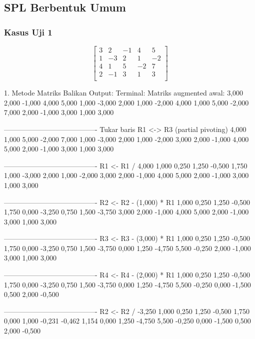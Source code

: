 \documentclass[12pt]{article}
\begin{document}
\begin{enumerate}
\subsection{SPL Berbentuk Umum}
\subsubsection{Kasus Uji 1}
\begin{equation}
    \begin{bmatrix}
        3 & 2 & -1 & 4 & 5 \\
        1 & -3 & 2 & 1 & -2 \\
        4 & 1 & 5 & -2 & 7 \\
        2 & -1 & 3 & 1 & 3 \\
    \end{bmatrix}
\end{equation}
\begin{keluaran}
1. Metode Matriks Balikan
Output:
Terminal:
Matriks augmented awal:
3,000   2,000   -1,000  4,000   5,000
1,000   -3,000  2,000   1,000   -2,000
4,000   1,000   5,000   -2,000  7,000
2,000   -1,000  3,000   1,000   3,000

----------------------------------------
Tukar baris R1 <-> R3 (partial pivoting)
4,000   1,000   5,000   -2,000  7,000
1,000   -3,000  2,000   1,000   -2,000
3,000   2,000   -1,000  4,000   5,000
2,000   -1,000  3,000   1,000   3,000

----------------------------------------
R1 <- R1 / 4,000
1,000   0,250   1,250   -0,500  1,750
1,000   -3,000  2,000   1,000   -2,000
3,000   2,000   -1,000  4,000   5,000
2,000   -1,000  3,000   1,000   3,000

----------------------------------------
R2 <- R2 - (1,000) * R1
1,000   0,250   1,250   -0,500  1,750
0,000   -3,250  0,750   1,500   -3,750
3,000   2,000   -1,000  4,000   5,000
2,000   -1,000  3,000   1,000   3,000

----------------------------------------
R3 <- R3 - (3,000) * R1
1,000   0,250   1,250   -0,500  1,750
0,000   -3,250  0,750   1,500   -3,750
0,000   1,250   -4,750  5,500   -0,250
2,000   -1,000  3,000   1,000   3,000

----------------------------------------
R4 <- R4 - (2,000) * R1
1,000   0,250   1,250   -0,500  1,750
0,000   -3,250  0,750   1,500   -3,750
0,000   1,250   -4,750  5,500   -0,250
0,000   -1,500  0,500   2,000   -0,500

----------------------------------------
R2 <- R2 / -3,250
1,000   0,250   1,250   -0,500  1,750
0,000   1,000   -0,231  -0,462  1,154
0,000   1,250   -4,750  5,500   -0,250
0,000   -1,500  0,500   2,000   -0,500


\end{keluaran}
\end{enumerate}
\end{document}
